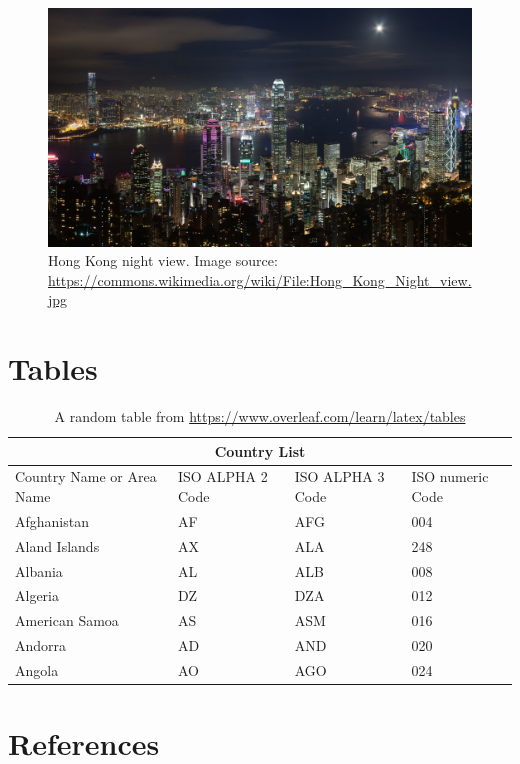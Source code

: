 \documentclass[12pt,notitlepage]{article}
\begin{document}

\begin{figure}[H]
  \includegraphics[width=\linewidth]{hk}
  \caption{Hong Kong night view. Image source: \url{https://commons.wikimedia.org/wiki/File:Hong_Kong_Night_view.jpg}}
  \label{fig:hk}
\end{figure}

\section{Tables}
\begin{table}[H]
\centering
\caption{A random table from \url{https://www.overleaf.com/learn/latex/tables}}
\label{tab:1}
\begin{tabular}{ |p{3cm}||p{3cm}|p{3cm}|p{3cm}|  }
 \hline
 \multicolumn{4}{|c|}{Country List} \\
 \hline
 Country Name     or Area Name& ISO ALPHA 2 Code &ISO ALPHA 3 Code&ISO numeric Code\\
 \hline
 Afghanistan   & AF    &AFG&   004\\
 Aland Islands&   AX  & ALA   &248\\
 Albania &AL & ALB&  008\\
 Algeria    &DZ & DZA&  012\\
 American Samoa&   AS  & ASM&016\\
 Andorra& AD  & AND   &020\\
 Angola& AO  & AGO&024\\
 \hline
\end{tabular}
\end{table}

\clearpage
{}
\setcounter{page}{1}
\section{References}
\printbibliography[heading=none]
\end{document}
